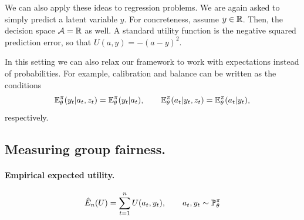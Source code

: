 \begin{example}[Regression]
  We can also apply these ideas to regression problems. We are again
  asked to simply predict a latent variable $y$. For concreteness,
  assume $y \in {\mathbb{R}}$. Then, the decision space ${\mathcal{A}} = {\mathbb{R}}$ as
  well. A standard utility function is the negative squared prediction
  error, so that $U(a, y) = - (a - y)^2$.

  In this setting we can also relax our framework to work with
  expectations instead of probabilities. For example, calibration and balance can be written as the conditions
  \[
    \mathop{\mbox{\ensuremath{\mathbb{E}}}}\nolimits_\theta^\pi(y_t | a_t, z_t) = \mathop{\mbox{\ensuremath{\mathbb{E}}}}\nolimits_\theta^\pi(y_t | a_t),
    \qquad
    \mathop{\mbox{\ensuremath{\mathbb{E}}}}\nolimits_\theta^\pi(a_t | y_t, z_t) = \mathop{\mbox{\ensuremath{\mathbb{E}}}}\nolimits_\theta^\pi(a_t | y_t),
  \]
  respectively.
\end{example}

\subsection{Measuring group fairness.}



\paragraph{Empirical expected utility.}
\[
  \hat{E}_n(U) = \sum_{t=1}^n U(a_t,y_t), \qquad a_t, y_t \sim \mathop{\mbox{\ensuremath{\mathbb{P}}}}\nolimits_\theta^\pi
\]


